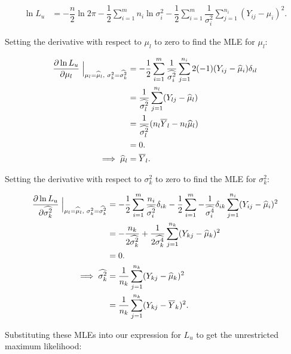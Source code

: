 \documentclass[12pt,a4paper]{article}
\newcommand{\ovY}{\overline{Y}}
\newcommand{\wmu}{\widehat{\mu}}
\newcommand{\wst}[1]{\widehat{\sigma^2_{#1}}}
\newcommand{\wstq}[1]{\widehat{\sigma^4_{#1}}}
\begin{document}
	\begin{align*}
		\ln{L_u} &= -\dfrac{n}{2} \ln{2\pi} - \dfrac{1}{2}\sum_{i=1}^m n_i \ln{\sigma^2_i} - \dfrac{1}{2}\sum_{i=1}^m \dfrac{1}{\sigma^2_i}\sum_{j=1}^{n_i} (Y_{ij}-\mu_i)^2.
	\end{align*}

	Setting the derivative with respect to $\mu_l$ to zero to find the MLE for $\mu_l$:
	
	\begin{align*}
		\dfrac{\partial \ln{L_u}}{\partial \mu_l} \Bigm\lvert_{\mu_l=\wmu_l, \hspace{0.1cm}\sigma^2_k = \wst{k}} &= -\dfrac{1}{2}\sum_{i=1}^m \dfrac{1}{\wst{i}}\sum_{j=1}^{n_i} 2(-1)(Y_{ij}-\wmu_i)\delta_{il} \\
		&= \dfrac{1}{\wst{l}} \sum_{j=1}^{n_l} (Y_{lj}-\wmu_l) \\
		&= \dfrac{1}{\wst{l}} (n_l \ovY_l  -n_l \wmu_l) \\
		&= 0. \\
		\implies \wmu_l &= \ovY_l.
	\end{align*}

	Setting the derivative with respect to $\sigma^2_k$ to zero to find the MLE for $\sigma^2_k$:
	
	\begin{align*}
		\dfrac{\partial \ln{L_u}}{\partial \wst{k}}\Bigm\lvert_{\mu_l=\wmu_l, \hspace{0.1cm}\sigma^2_k = \wst{k}} &= -\dfrac{1}{2}\sum_{i=1}^m \dfrac{n_i}{\wst{i}} \delta_{ik} - \dfrac{1}{2}\sum_{i=1}^m -\dfrac{1}{\wstq{i}} \delta_{ik}\sum_{j=1}^{n_i} (Y_{ij}-\wmu_i)^2 \\
		&= -\dfrac{n_k}{2\wst{k}} + \dfrac{1}{2\wstq{k}}\sum_{j=1}^{n_k} (Y_{kj}-\wmu_k)^2 \\
		&= 0. \\
		\implies \wst{k} &= \dfrac{1}{n_k} \sum_{j=1}^{n_k} (Y_{kj}-\wmu_k)^2 \\
		&= \dfrac{1}{n_k} \sum_{j=1}^{n_k} (Y_{kj}-\ovY_k)^2.
	\end{align*}

	Substituting these MLEs into our expression for $L_u$ to get the unrestricted maximum likelihood:
	
\end{document}
